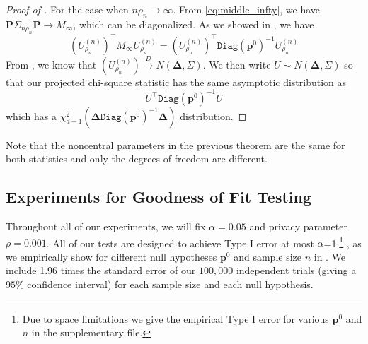 \documentclass[twoside,letterpaper]{article} \usepackage{aistats2017}
\theoremstyle{definition}
\theoremstyle{remark}
\begin{document}
\begin{proof}[Proof of ]
For the case when $n \rho_n \to \infty$.  From \eqref{eq:middle_infty}, we have ${\pmb{P}} {{\Sigma}_{{n \rho_n}}}{\pmb{P}} \to M_\infty$, which can be diagonalized.  As we showed in , we have 
$$
\left({U^{(n)}_{{\rho_n}}}\right)^\intercal M_\infty {U^{(n)}_{{\rho_n}}} =  \left({U^{(n)}_{{\rho_n}}}\right)^\intercal {\ensuremath{\mathtt{Diag}}}({{\mathbf{p}}^0})^{-1} {U^{(n)}_{{\rho_n}}}
$$
From , we know that $\left({U^{(n)}_{{\rho_n}}}\right)\stackrel{D}{\to} N(\pmb{\Delta},{\Sigma})$.  We then write $U \sim N(\pmb{\Delta},{\Sigma})$ so that our projected chi-square statistic has the same asymptotic distribution as 
$$
U^\intercal{\ensuremath{\mathtt{Diag}}}({{\mathbf{p}}^0})^{-1} U
$$
which has a $\chi^2_{d-1}(\pmb{\Delta}{\ensuremath{\mathtt{Diag}}}({{\mathbf{p}}^0})^{-1} \pmb{\Delta})$ distribution.
\end{proof}

Note that the noncentral parameters in the previous theorem are the same for both statistics and only the degrees of freedom are different.  
\fi

\subsection{Experiments for Goodness of Fit Testing}\label{sect:GOF_Results}
Throughout all of our experiments, we will fix $\alpha = 0.05$ and privacy parameter $\rho = 0.001$.  All of our tests are designed to achieve Type I error at most 
$\alpha$=1.\footnote{Due to space limitations we give the empirical Type I error for various ${{\mathbf{p}}^0}$ and $n$ in the supplementary file. }
\else, as we empirically show for different null hypotheses ${{\mathbf{p}}^0}$ and sample size $n$ in .  We include 1.96 times the standard error of our $100,000$ independent trials (giving a $95\%$ confidence interval) for each sample size and each null hypothesis.
\fi
\end{document}
